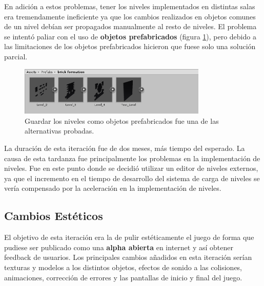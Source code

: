 En adición a estos problemas, tener los niveles implementados en distintas salas era tremendamente ineficiente ya que los cambios realizados en objetos comunes de un nivel debían ser propagados manualmente al resto de niveles. El problema se intentó paliar con el uso de \textbf{objetos prefabricados} (figura \ref{brick_prefab}), pero debido a las limitaciones de los objetos prefabricados hicieron que fuese solo una solución parcial. 
\begin{figure}[h]
    \centering
    \includegraphics[width=0.8\textwidth]{images/resultados/desarrollo/brick_prefab}
    \caption{Guardar los niveles como objetos prefabricados fue una de las alternativas probadas.}
    \label{brick_prefab}
\end{figure}

La duración de esta iteración fue de dos meses, más tiempo del esperado. La causa de esta tardanza fue principalmente los problemas en la implementación de niveles. Fue en este punto donde se decidió utilizar un editor de niveles externos, ya que el incremento en el tiempo de desarrollo del sistema de carga de niveles se vería compensado por la aceleración en la implementación de niveles.

\subsection{Cambios Estéticos}
El objetivo de esta iteración era la de pulir estéticamente el juego de forma que pudiese ser publicado como una \textbf{alpha abierta} en internet y así obtener feedback de usuarios. Los principales cambios añadidos en esta iteración serían texturas y modelos a los distintos objetos, efectos de sonido a las colisiones, animaciones, corrección de errores y las pantallas de inicio y final del juego.

